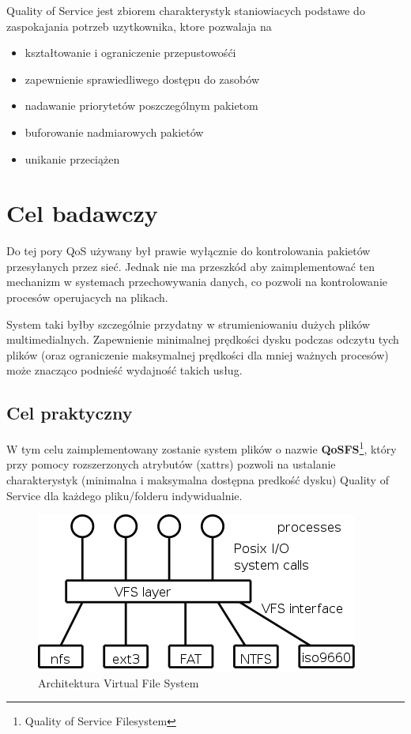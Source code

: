 Quality of Service jest zbiorem charakterystyk staniowiacych podstawe do zaspokajania potrzeb
uzytkownika, ktore pozwalaja na
\begin{itemize}
\item kształtowanie i ograniczenie przepustowośći
\item zapewnienie sprawiedliwego dostępu do zasobów
\item nadawanie priorytetów poszczególnym pakietom
\item buforowanie nadmiarowych pakietów
\item unikanie przeciążen
\end{itemize}

\section{Cel badawczy}
Do tej pory QoS używany był prawie wyłącznie do kontrolowania pakietów przesyłanych przez sieć.
Jednak nie ma przeszkód aby zaimplementować ten mechanizm w systemach przechowywania danych, co
pozwoli na kontrolowanie procesów operujacych na plikach.

System taki byłby szczególnie przydatny w strumieniowaniu dużych plików multimedialnych.
Zapewnienie minimalnej prędkości dysku podczas odczytu tych plików (oraz ograniczenie maksymalnej
prędkości dla mniej ważnych procesów) może znacząco podnieść wydajność
takich usług.

\subsection{Cel praktyczny}
W tym celu zaimplementowany zostanie system plików o nazwie \textbf{QoSFS}\footnote{Quality of Service Filesystem}, który przy pomocy rozszerzonych atrybutów
(xattrs) pozwoli na ustalanie charakterystyk (minimalna i maksymalna dostępna predkość dysku)
Quality of Service dla każdego pliku/folderu indywidualnie. 

\begin{figure}[h!]
	\centering
	\includegraphics[scale=0.5]{vfs.png}
	\caption{Architektura Virtual File System}
\end{figure}

